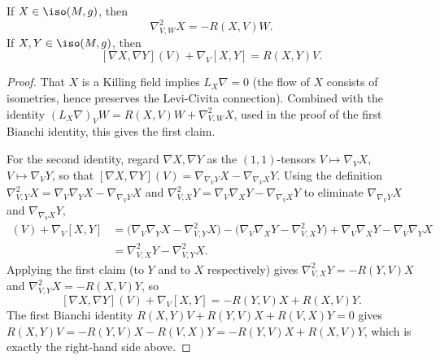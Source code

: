 \begin{proposition}[Proposition 8.1.3]
  \label{prop:pet-ch8-killing-curvature-identities}
  If $X\in\iso(M,g)$, then
  \[
    \nabla^2_{V,W}X=-R(X,V)W.
  \]
  If $X,Y\in\iso(M,g)$, then
  \[
    [\nabla X,\nabla Y](V)+\nabla_V[X,Y]=R(X,Y)V.
  \]
\end{proposition}
\begin{proof}
  That $X$ is a Killing field implies $L_X\nabla=0$ (the flow of $X$ consists of
  isometries, hence preserves the Levi-Civita connection). Combined with the
  identity $(L_X\nabla)_VW=R(X,V)W+\nabla^2_{V,W}X$, used in the proof of the
  first Bianchi identity, this gives the first claim.

  For the second identity, regard $\nabla X,\nabla Y$ as the $(1,1)$-tensors
  $V\mapsto\nabla_VX$, $V\mapsto\nabla_VY$, so that
  $[\nabla X,\nabla Y](V)=\nabla_{\nabla_VY}X-\nabla_{\nabla_VX}Y$. Using the
  definition $\nabla^2_{V,Y}X=\nabla_V\nabla_YX-\nabla_{\nabla_VY}X$ and
  $\nabla^2_{V,X}Y=\nabla_V\nabla_XY-\nabla_{\nabla_VX}Y$ to eliminate
  $\nabla_{\nabla_VY}X$ and $\nabla_{\nabla_VX}Y$,
  \begin{align*}
    [\nabla X,\nabla Y](V)+\nabla_V[X,Y]
    &=\big(\nabla_V\nabla_YX-\nabla^2_{V,Y}X\big)-\big(\nabla_V\nabla_XY-\nabla^2_{V,X}Y\big)
      +\nabla_V\nabla_XY-\nabla_V\nabla_YX\\
    &=\nabla^2_{V,X}Y-\nabla^2_{V,Y}X.
  \end{align*}
  Applying the first claim (to $Y$ and to $X$ respectively) gives
  $\nabla^2_{V,X}Y=-R(Y,V)X$ and $\nabla^2_{V,Y}X=-R(X,V)Y$, so
  \[
    [\nabla X,\nabla Y](V)+\nabla_V[X,Y]=-R(Y,V)X+R(X,V)Y.
  \]
  The first Bianchi identity $R(X,Y)V+R(Y,V)X+R(V,X)Y=0$ gives
  $R(X,Y)V=-R(Y,V)X-R(V,X)Y=-R(Y,V)X+R(X,V)Y$, which is exactly the right-hand
  side above.
\end{proof}

